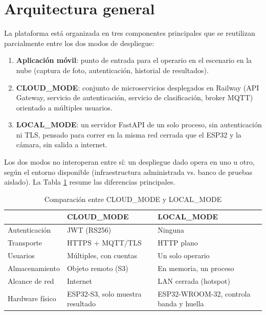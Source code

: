 \section{Arquitectura general}
\label{sec:arquitectura_general}

La plataforma está organizada en tres componentes principales que se
reutilizan parcialmente entre los dos modos de despliegue:

\begin{enumerate}
  \item \textbf{Aplicación móvil}: punto de entrada para el operario en
  el escenario en la nube (captura de foto, autenticación, historial de
  resultados).
  \item \textbf{CLOUD\_MODE}: conjunto de microservicios desplegados en
  Railway (API Gateway, servicio de autenticación, servicio de
  clasificación, broker MQTT) orientado a múltiples usuarios.
  \item \textbf{LOCAL\_MODE}: un servidor FastAPI de un solo proceso,
  sin autenticación ni TLS, pensado para correr en la misma red cerrada
  que el ESP32 y la cámara, sin salida a internet.
\end{enumerate}

Los dos modos no interoperan entre sí: un despliegue dado opera en uno
u otro, según el entorno disponible (infraestructura administrada vs.
banco de pruebas aislado). La Tabla \ref{tab:comparacion} resume las
diferencias principales.

\begin{table}[H]
\centering
\caption{Comparación entre CLOUD\_MODE y LOCAL\_MODE}
\label{tab:comparacion}
\begin{tabular}{@{}p{2.1cm}p{2.7cm}p{2.7cm}@{}}
\toprule
 & \textbf{CLOUD\_MODE} & \textbf{LOCAL\_MODE} \\
\midrule
Autenticación & JWT (RS256) & Ninguna \\
Transporte & HTTPS + MQTT/TLS & HTTP plano \\
Usuarios & Múltiples, con cuentas & Un solo operario \\
Almacenamiento & Objeto remoto (S3) & En memoria, un proceso \\
Alcance de red & Internet & LAN cerrada (hotspot) \\
Hardware físico & ESP32-S3, solo muestra resultado & ESP32-WROOM-32, controla banda y huella \\
\bottomrule
\end{tabular}
\end{table}
